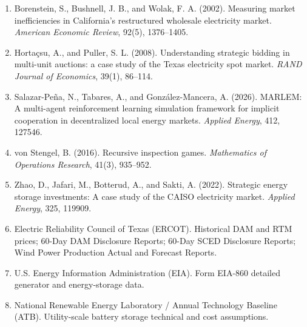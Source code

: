 \documentclass[10pt]{article}
\begin{document}
\begin{enumerate}[leftmargin=1.5em]

\item Borenstein, S., Bushnell, J. B., and Wolak, F. A. (2002).
Measuring market inefficiencies in California's restructured wholesale electricity market.
\textit{American Economic Review}, 92(5), 1376--1405.

\item Horta\c{c}su, A., and Puller, S. L. (2008).
Understanding strategic bidding in multi-unit auctions: a case study of the Texas electricity spot market.
\textit{RAND Journal of Economics}, 39(1), 86--114.

\item Salazar-Pe\~na, N., Tabares, A., and Gonz\'alez-Mancera, A. (2026).
MARLEM: A multi-agent reinforcement learning simulation framework for implicit cooperation in decentralized local energy markets.
\textit{Applied Energy}, 412, 127546.

\item von Stengel, B. (2016).
Recursive inspection games.
\textit{Mathematics of Operations Research}, 41(3), 935--952.

\item Zhao, D., Jafari, M., Botterud, A., and Sakti, A. (2022).
Strategic energy storage investments: A case study of the CAISO electricity market.
\textit{Applied Energy}, 325, 119909.

\item Electric Reliability Council of Texas (ERCOT).
Historical DAM and RTM prices; 60-Day DAM Disclosure Reports; 60-Day SCED Disclosure Reports; Wind Power Production Actual and Forecast Reports.

\item U.S. Energy Information Administration (EIA).
Form EIA-860 detailed generator and energy-storage data.

\item National Renewable Energy Laboratory / Annual Technology Baseline (ATB).
Utility-scale battery storage technical and cost assumptions.

\end{enumerate}
\end{document}
